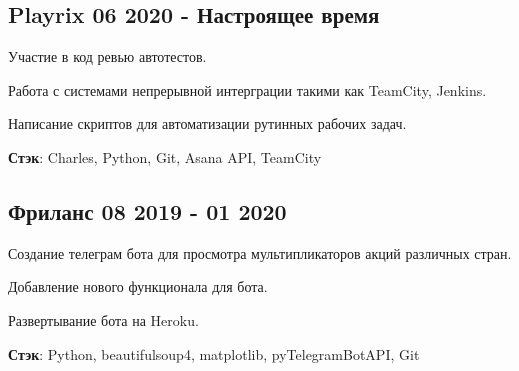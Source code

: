 \documentclass[a4paper,12pt]{article}
\begin{document}


\vspace*{2pt}

\subsection{{Playrix }\hfill 06 2020 - Настроящее время}

\begin{zitemize}
\item Участие в код ревью автотестов. 
\item Работа с системами непрерывной интерграции такими как TeamCity, Jenkins.
\item Написание скриптов для автоматизации рутинных рабочих задач.
\end{zitemize}

\vspace*{0.5pt} \textbf {Стэк}: Charles, Python, Git, Asana API, TeamCity



\vspace*{8pt}

\subsection{{Фриланс }\hfill 08 2019 - 01 2020}

\begin{zitemize}
\item Создание телеграм бота для просмотра мультипликаторов акций различных стран. 
\item Добавление нового функционала для бота.
\item Развертывание бота на Heroku.
\end{zitemize}

\vspace*{0.5pt} \textbf {Стэк}: Python, beautifulsoup4, matplotlib, pyTelegramBotAPI, Git
\end{document}
